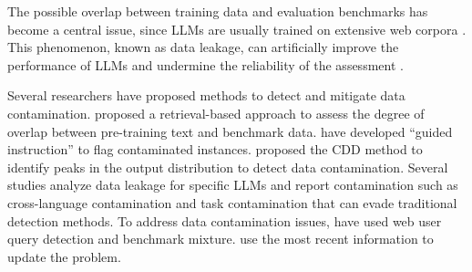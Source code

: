 The possible overlap between training data and evaluation benchmarks has become a central issue, since LLMs are usually trained on extensive web corpora 
\cite{dodge2021documenting}. This phenomenon, known as data leakage, can artificially improve the performance of LLMs and undermine the reliability of the assessment \cite{deng2024unveiling, jiang2024investigating}.


Several researchers have proposed methods to detect and mitigate data contamination. \citet{deng2024investigating} proposed a retrieval-based approach to assess the degree of overlap between pre-training text and benchmark data. \citet{golchin2023time} have developed ``guided instruction'' to flag contaminated instances. \citet{dong2024generalization} proposed the CDD method to identify peaks in the output distribution to detect data contamination. Several studies analyze data leakage for specific LLMs \cite{balloccu2024leak} and report contamination such as cross-language contamination \cite{yao2024data} and task contamination \cite{li2024task} that can evade traditional detection methods. To address data contamination issues, \citet{ni2024mixeval} have used web user query detection and benchmark mixture. \citet{white2024livebench} use the most recent information to update the problem.

